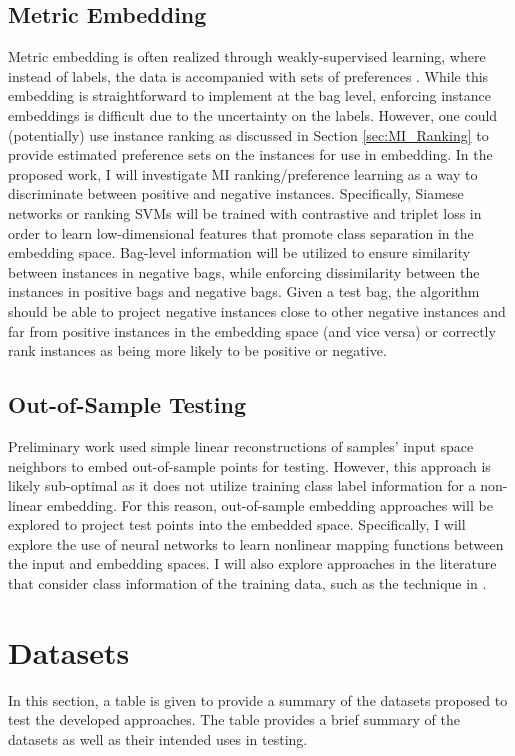 \subsection{Metric Embedding}
Metric embedding is often realized through weakly-supervised learning, where instead of labels, the data is accompanied with sets of preferences \citep{Hermans2017DefenseTripletLoss,Koch2015SiameseNetworks,Schroff2015FaceNet}. While this embedding is straightforward to implement at the bag level, enforcing instance embeddings is difficult due to the uncertainty on the labels.  However, one could (potentially) use instance ranking as discussed in Section \ref{sec:MI_Ranking} to provide estimated preference sets on the instances for use in embedding.  In the proposed work, I will investigate MI ranking/preference learning as a way to discriminate between positive and negative instances.  Specifically, Siamese networks or ranking SVMs will be trained with contrastive and triplet loss in order to learn low-dimensional features that promote class separation in the embedding space.  Bag-level information will be utilized to ensure similarity between instances in negative bags, while enforcing dissimilarity between the instances in positive bags and negative bags.  Given a test bag, the algorithm should be able to project negative instances close to other negative instances and far from positive instances in the embedding space (and vice versa) or correctly rank instances as being more likely to be positive or negative.

\subsection{Out-of-Sample Testing}
Preliminary work used simple linear reconstructions of  samples' input space neighbors to embed out-of-sample points for testing.  However, this approach is likely sub-optimal as it does not utilize training class label information for a non-linear embedding.  For this reason, out-of-sample embedding approaches will be explored to project test points into the embedded space.  Specifically, I will explore the use of neural networks to learn nonlinear mapping functions between the input and embedding spaces.  I will also explore  approaches in the literature that consider class information of the training data, such as the technique in \citep{Vural2016OutOfSampleSupManifoldLearning}. 

\section{Datasets}
In this section, a table is given to provide a summary of the datasets proposed to test the developed approaches.  The table provides a brief summary of the datasets as well as their intended uses in testing.

